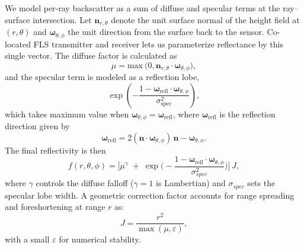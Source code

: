 We model per-ray backscatter as a sum of diffuse and specular terms at the ray–surface intersection.
Let $\mathbf{n}_{r,\theta}$ denote the unit surface normal of the height field at \((r,\theta)\) and $\boldsymbol{\omega}_{\theta,\phi}$ the unit direction from the surface back to the sensor. 
Co-located FLS transmitter and receiver lets us parameterize reflectance by this single vector.
The diffuse factor is calculated as
\vspace{-1.5mm}
\begin{equation}
\mu = \mathrm{max}\:\!\big(0, \mathbf{n}_{r,\theta}\!\cdot\!\boldsymbol{\omega}_{\theta,\phi}\big),
\end{equation}
and the specular term is modeled as a reflection lobe,
\begin{equation}
\exp\left(-\frac{1-\boldsymbol{\omega}_\text{refl}\!\cdot\!\boldsymbol{\omega}_{\theta,\phi}}{\sigma_{\text{spec}}^2}\right), %
\end{equation}
which takes maximum value when \(\boldsymbol{\omega}_{\theta,\phi}=\boldsymbol{\omega}_\text{refl}\), where \(\boldsymbol{\omega}_\text{refl}\) is the reflection direction given by
\begin{equation}
\boldsymbol{\omega}_\text{refl} = 2(\mathbf{n}\!\cdot\!\boldsymbol{\omega}_{\theta,\phi})\,\mathbf{n} - \boldsymbol{\omega}_{\theta,\phi}.
\end{equation}
The final reflectivity is then
\begin{equation}
f(r, \theta, \phi) = 
\Big[
\mu^{\gamma}
\;+\;
\exp\!\Big(-\frac{1-\boldsymbol{\omega}_\text{refl}\!\cdot\!\boldsymbol{\omega}_{\theta,\phi}}{\sigma_{spec}^2}\Big)
\Big]\,J,
\label{eq:reflectance}
\end{equation}
where $\gamma$ controls the diffuse falloff ($\gamma{=}1$ is Lambertian) and $\sigma_{spec}$ sets the specular lobe width. A geometric correction factor accounts for range spreading and foreshortening at range \(r\) as:
\vspace{-2mm}
\begin{equation}
J = \frac{r^2}{\max(\mu,\varepsilon)},
\end{equation}
with a small $\varepsilon$ for numerical stability.

